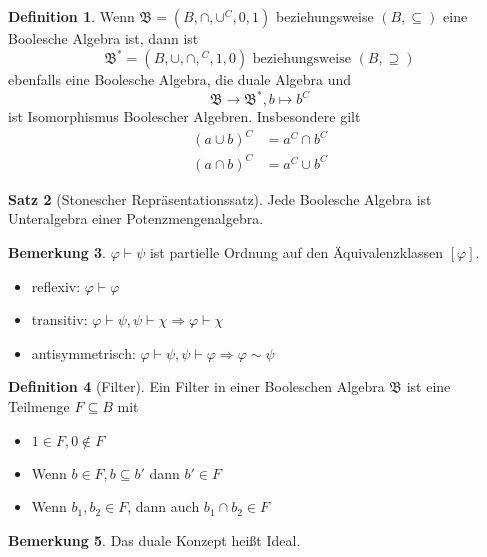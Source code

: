 \documentclass[12pt,parskip=full]{scrartcl}
\theoremstyle{definition}
\newtheorem{theorem}{Satz}[section]
\newtheorem{definition}[theorem]{Definition}
\newtheorem{remark}[theorem]{Bemerkung}
\begin{document}
	\begin{definition}
		Wenn $\mathfrak{B} = (B, \cap, \cup {}^C, 0, 1)$ beziehungsweise $(B, \subseteq)$ eine Boolesche Algebra ist, dann ist
		\begin{equation*}
			\mathfrak{B}^* = (B, \cup, \cap, {}^C, 1, 0) \text{ beziehungsweise } (B, \supseteq)
		\end{equation*}
		ebenfalls eine Boolesche Algebra, die duale Algebra und
		\begin{equation*}
			\mathfrak{B} \to \mathfrak{B}^*, b \mapsto b^C
		\end{equation*}
		ist Isomorphismus Boolescher Algebren. Insbesondere gilt
		\begin{align*}
			(a \cup b)^C &= a^C \cap b^C \\
			(a \cap b)^C &= a^C \cup b^C
		\end{align*}
	\end{definition}

	\begin{theorem}[Stonescher Repräsentationssatz]
		Jede Boolesche Algebra ist Unteralgebra einer Potenzmengenalgebra.
	\end{theorem}

	\begin{remark}
		$\varphi \vdash \psi$ ist partielle Ordnung auf den Äquivalenzklassen $[\varphi]$.
		\begin{itemize}
			\item reflexiv: $\varphi \vdash \varphi$
			\item transitiv: $\varphi \vdash \psi, \psi \vdash \chi \Rightarrow \varphi \vdash \chi$
			\item antisymmetrisch: $\varphi \vdash \psi, \psi \vdash \varphi \Rightarrow \varphi \sim \psi$
		\end{itemize}
	\end{remark}

	\begin{definition}[Filter]
		Ein Filter in einer Booleschen Algebra $\mathfrak{B}$ ist eine Teilmenge $F \subseteq B$ mit
		\begin{itemize}
			\item $1 \in F, 0 \notin F$
			\item Wenn $b \in F, b \subseteq b'$ dann $b' \in F$
			\item Wenn $b_1, b_2 \in F$, dann auch $b_1 \cap b_2 \in F$
		\end{itemize}
	\end{definition}

	\begin{remark}
		Das duale Konzept heißt Ideal.
	\end{remark}
\end{document}
